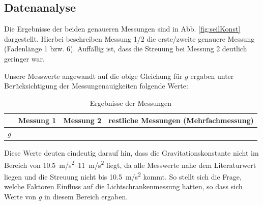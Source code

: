 \documentclass[11pt,a4paper,titlepage, ngerman]{article}
\begin{document}
		\subsection{Datenanalyse}
		\label{Auswertung}	
	
			Die Ergebnisse der beiden genaueren Messungen sind in Abb. \ref{fig:seilKonst} dargestellt.
			Hierbei beschreiben \glqq Messung 1/2\grqq {} die erste/zweite genauere Messung (Fadenlänge 1 bzw. 6).
			Auffällig ist, dass die Streuung bei Messung 2 deutlich geringer war.
			
			Unsere Messwerte angewandt auf die obige Gleichung für $g$ ergaben unter Berücksichtigung der Messungenauigkeiten folgende Werte:
			
			\begin{table}
				\label{Tab:WerteTabelle}
				\centering
				\begin{tabular}{l|S|S|S}
					\hline
					& {Messung 1} & {Messung 2} & {restliche Messungen (Mehrfachmessung)} \\ \hline
					$g$ &  &  & \\ \hline %
				\end{tabular}
				\caption{Ergebnisse der Messungen}
			\end{table}
			
			Diese Werte deuten eindeutig darauf hin, dass die Gravitationskonstante nicht im Bereich von \SIrange{10,5}{11}{m/s^2} liegt, da alle Messwerte nahe dem Literaturwert liegen und die Streuung nicht bis \SI{10,5}{m/s^2} kommt.
			So stellt sich die Frage, welche Faktoren Einfluss auf die Lichtschrankenmessung hatten, so dass sich Werte von $g$ in diesem Bereich ergaben. 
							
\end{document}
